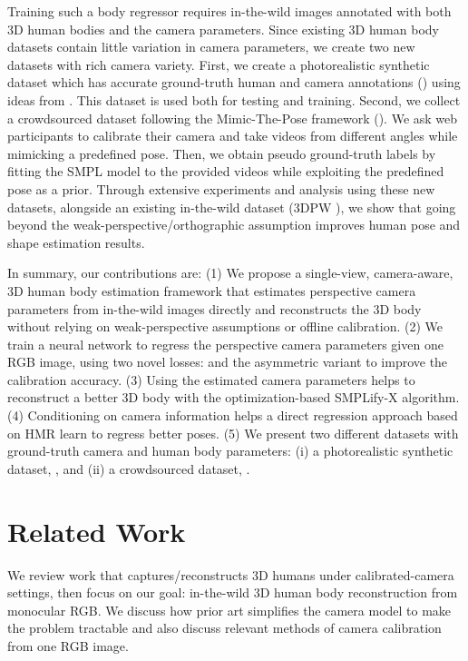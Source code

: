 \documentclass[10pt,twocolumn,letterpaper,usenames,dvipsnames]{article}
\begin{document}
Training such a body regressor requires in-the-wild images annotated with both 3D human bodies and the camera parameters.
Since existing 3D human body datasets \cite{ionescu_h36m,mpiiinf3dhp_mono-2017,vonMarcard2018_3dpw} contain little variation in camera parameters, we create two new datasets with rich camera variety. First, we create a photorealistic synthetic dataset which has accurate ground-truth human and camera annotations (\agoracam) using ideas from \cite{patel2021agora}. This dataset is used both for testing and training. Second, we collect a crowdsourced dataset following the Mimic-The-Pose framework \cite{Mueller:CVPR:21} (\mtpcam). 
We ask web participants to calibrate their camera and take videos from different angles while mimicking a predefined pose. Then, we obtain pseudo ground-truth labels by fitting the SMPL model to the provided videos while exploiting the predefined pose as a prior.
Through extensive experiments and analysis using these new datasets, alongside an existing in-the-wild dataset (3DPW \cite{vonMarcard2018_3dpw}), we show that going beyond the weak-perspective/orthographic assumption improves human pose and shape estimation results.

In summary, our contributions are:
(1) We propose a single-view, camera-aware, 3D human body estimation framework that estimates perspective camera parameters from in-the-wild images directly and reconstructs the 3D body without relying on weak-perspective assumptions or offline calibration. 
(2) We train a neural network to regress the perspective camera parameters given one RGB image, using two novel losses: \softltwo and the asymmetric variant to improve the calibration accuracy. 
    (3) Using the estimated camera parameters  helps to reconstruct a better 3D body with the optimization-based SMPLify-X algorithm.
    (4) Conditioning on camera information helps a direct regression approach based on HMR \cite{kanazawa_hmr} learn to regress better poses.
(5) We present two different datasets with ground-truth camera and human body parameters: (i) a photorealistic synthetic dataset, \agoracam, and (ii) a crowdsourced dataset, \mtpcam. 


 \section{Related Work}
\label{related_work}
We review work that captures/reconstructs 3D humans under calibrated-camera settings, then focus on our goal: in-the-wild 3D human body reconstruction from monocular RGB. 
We discuss how prior art simplifies the camera model to make the problem tractable and also discuss relevant methods of camera calibration from one RGB image.
\end{document}
